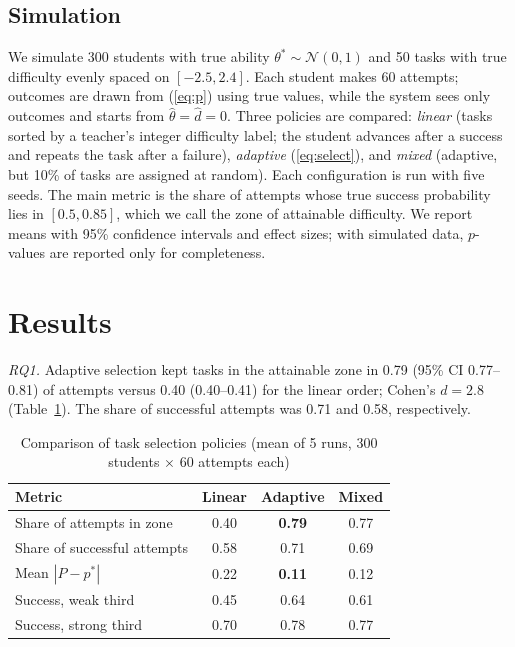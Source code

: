 \documentclass[conference]{IEEEtran}
\begin{document}
\subsection{Simulation}
We simulate 300 students with true ability $\theta^{*} \sim \mathcal{N}(0, 1)$ and 50 tasks with true difficulty evenly spaced on $[-2.5, 2.4]$. Each student makes 60 attempts; outcomes are drawn from (\ref{eq:p}) using true values, while the system sees only outcomes and starts from $\hat\theta = \hat d = 0$. Three policies are compared: \emph{linear} (tasks sorted by a teacher's integer difficulty label; the student advances after a success and repeats the task after a failure), \emph{adaptive} (\ref{eq:select}), and \emph{mixed} (adaptive, but 10\% of tasks are assigned at random). Each configuration is run with five seeds. The main metric is the share of attempts whose true success probability lies in $[0.5, 0.85]$, which we call the zone of attainable difficulty. We report means with 95\% confidence intervals and effect sizes; with simulated data, $p$-values are reported only for completeness.

\section{Results}
\label{sec:results}
\textit{RQ1.} Adaptive selection kept tasks in the attainable zone in 0.79 (95\% CI 0.77--0.81) of attempts versus 0.40 (0.40--0.41) for the linear order; Cohen's $d = 2.8$ (Table~\ref{tab:policies}). The share of successful attempts was 0.71 and 0.58, respectively.

\begin{table}[t]
\caption{Comparison of task selection policies (mean of 5 runs, 300 students $\times$ 60 attempts each)}
\label{tab:policies}
\centering
\begin{tabular}{@{}lccc@{}}
\toprule
Metric & Linear & Adaptive & Mixed \\
\midrule
Share of attempts in zone & 0.40 & \textbf{0.79} & 0.77 \\
Share of successful attempts & 0.58 & 0.71 & 0.69 \\
Mean $|P - p^{*}|$ & 0.22 & \textbf{0.11} & 0.12 \\
Success, weak third & 0.45 & 0.64 & 0.61 \\
Success, strong third & 0.70 & 0.78 & 0.77 \\
\bottomrule
\end{tabular}
\end{table}
\end{document}
